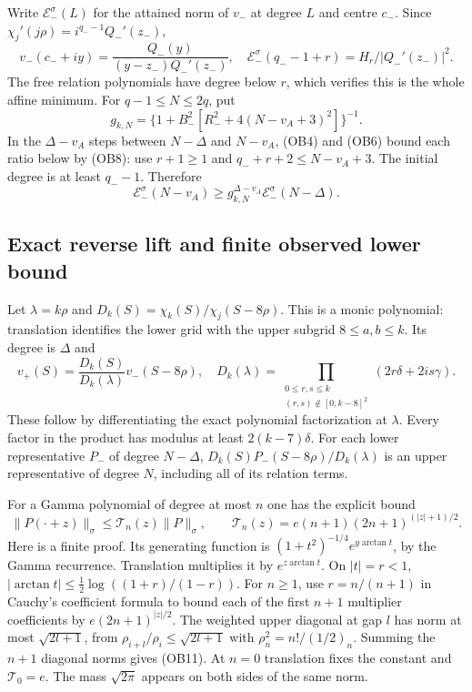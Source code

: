 Write $\mathcal E_-^\sigma(L)$ for the attained norm of $v_-$ at
degree $L$ and centre $c_-$. Since
$\chi_j'(j\rho)=i^{q_--1}Q_-'(z_-)$,
\[
 v_-(c_-+iy)=\frac{Q_-(y)}{(y-z_-)Q_-'(z_-)},\quad
 \mathcal E_-^\sigma(q_--1+r)=H_r/|Q_-'(z_-)|^2.\tag{OB7}
\]
The free relation polynomials have degree below $r$, which verifies
this is the whole affine minimum. For $q-1\le N\le2q$, put
\[
 g_{k,N}=\{1+B_-^2[R_-^2+4(N-v_A+3)^2]\}^{-1}.\tag{OB8}
\]
In the $\Delta-v_A$ steps between $N-\Delta$ and $N-v_A$, (OB4)
and (OB6) bound each ratio below by (OB8): use $r+1\ge1$ and
$q_-+r+2\le N-v_A+3$. The initial degree is at least $q_--1$.
Therefore
\[
 \mathcal E_-^\sigma(N-v_A)\ge
 g_{k,N}^{\Delta-v_A}\mathcal E_-^\sigma(N-\Delta).\tag{OB9}
\]

\subsection{Exact reverse lift and finite observed lower bound}
Let $\lambda=k\rho$ and
$D_k(S)=\chi_k(S)/\chi_j(S-8\rho)$. This is a monic polynomial:
translation identifies the lower grid with the upper subgrid
$8\le a,b\le k$. Its degree is $\Delta$ and
\[
 v_+(S)=\frac{D_k(S)}{D_k(\lambda)}v_-(S-8\rho),\quad
 D_k(\lambda)=\prod_{\substack{0\le r,s\le k\\(r,s)\notin[0,k-8]^2}}
 (2r\delta+2is\gamma).\tag{OB10}
\]
These follow by differentiating the exact polynomial factorization at
$\lambda$. Every factor in the product has modulus at least
$2(k-7)\delta$. For each lower representative $P_-$ of degree
$N-\Delta$, $D_k(S)P_-(S-8\rho)/D_k(\lambda)$ is an upper
representative of degree $N$, including all of its relation terms.

For a Gamma polynomial of degree at most $n$ one has the explicit bound
\[
 \|P(\cdot+z)\|_\sigma\le\mathcal T_n(z)\|P\|_\sigma,
 \qquad\mathcal T_n(z)=e(n+1)(2n+1)^{(|z|+1)/2}.\tag{OB11}
\]
Here is a finite proof. Its generating function is
$(1+t^2)^{-1/4}e^{y\arctan t}$, by the Gamma recurrence.
Translation multiplies it by $e^{z\arctan t}$. On $|t|=r<1$,
$|\arctan t|\le\tfrac12\log((1+r)/(1-r))$.
For $n\ge1$, use $r=n/(n+1)$ in Cauchy's coefficient formula to
bound each of the first $n+1$ multiplier coefficients by
$e(2n+1)^{|z|/2}$. The weighted upper diagonal at gap $l$ has norm
at most $\sqrt{2l+1}$, from $\rho_{i+l}/\rho_i\le\sqrt{2l+1}$
with $\rho_n^2=n!/(1/2)_n$. Summing the $n+1$ diagonal norms gives
(OB11). At $n=0$ translation fixes the constant and $\mathcal T_0=e$.
The mass $\sqrt{2\pi}$ appears on both sides of the same norm.


